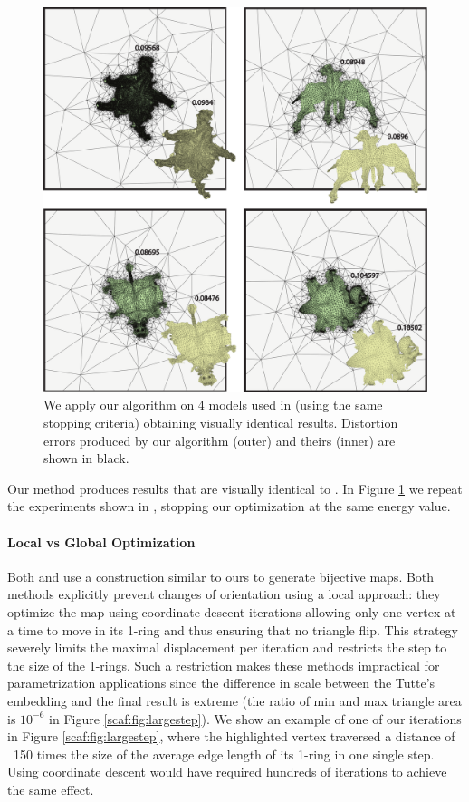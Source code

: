 \begin{figure}[t]
\centering
\includegraphics[width=\columnwidth]{scaf-tex/figs/compare_smith}
\caption{{We apply our algorithm on 4 models used in \cite{Smith:2015} (using the same stopping criteria) obtaining visually identical results. Distortion errors produced by our algorithm (outer) and theirs (inner) are shown in black.
}}
\label{scaf:fig:smith-all}
\vspace{-0.2cm}
\end{figure}

{Our method produces results that are visually identical to \cite{Smith:2015}. In Figure  \ref{scaf:fig:smith-all} we repeat the experiments shown in \cite{Smith:2015}, stopping our optimization at the same energy value.}

\paragraph{Local vs Global Optimization} 

Both \cite{Zhang:2005} and \cite{Misztal:2012} use a construction similar to ours to generate bijective maps. Both methods explicitly prevent changes of orientation using a local approach: they optimize the map using coordinate descent iterations \cite{SolomonBook} allowing only one vertex at a time to move in its 1-ring and thus ensuring that no triangle flip. This strategy severely limits the maximal displacement per iteration and restricts the step to the size of the 1-rings. Such a restriction makes these methods impractical for parametrization applications since the difference in scale between the Tutte's embedding and the final result is extreme (the ratio of min and max triangle area is $10^{-6}$ in Figure \ref{scaf:fig:largestep}). We show an example of one of our iterations in Figure \ref{scaf:fig:largestep}, where the highlighted vertex traversed a distance of ~150 times the size of the average edge length of its 1-ring in one single step. Using coordinate descent would have required hundreds of iterations to achieve the same effect. 

